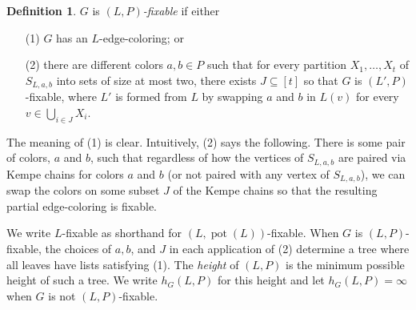 \documentclass[12pt]{article}
\theoremstyle{plain}
\theoremstyle{definition}
\newtheorem{defn}{Definition}
\theoremstyle{remark}
\newcommand{\irange}[1]{\left[#1\right]}
\newcommand{\pot}{\operatorname{pot}}
\begin{document}
\begin{defn}
$G$ is \emph{$(L, P)$-fixable} if either
\begin{enumerate}
\item[(1)] $G$ has an $L$-edge-coloring; or
\item[(2)] there are different colors $a,b \in P$ such that for every partition
$X_1, \ldots, X_t$ of $S_{L,a,b}$ into sets of size at most two, there exists $J
\subseteq \irange{t}$ so that $G$ is $(L', P)$-fixable, where $L'$ is formed
from $L$ by swapping $a$ and $b$ in $L(v)$ for every $v \in \bigcup_{i \in J} X_i$.
\end{enumerate}
\end{defn}

The meaning of (1) is clear.  Intuitively, (2) says the following.  There is
some pair of colors, $a$ and $b$, such that regardless of how the vertices of
$S_{L,a,b}$ are paired via Kempe chains for colors $a$ and $b$ (or not paired
with any vertex of $S_{L,a,b}$), we can swap the colors on some subset $J$ of
the Kempe chains so that the resulting partial edge-coloring is fixable.

We write $L$-fixable as shorthand for $(L, \pot(L))$-fixable. When $G$ is $(L,
P)$-fixable, the choices of $a,b$, and $J$ in each application of (2) determine
a tree where all leaves have lists satisfying (1).  The \emph{height} of $(L,
P)$ is the minimum possible height of such a tree.  We write $h_G(L, P)$ for
this height and let $h_G(L, P) = \infty$ when $G$ is not $(L,P)$-fixable. 
\end{document}
